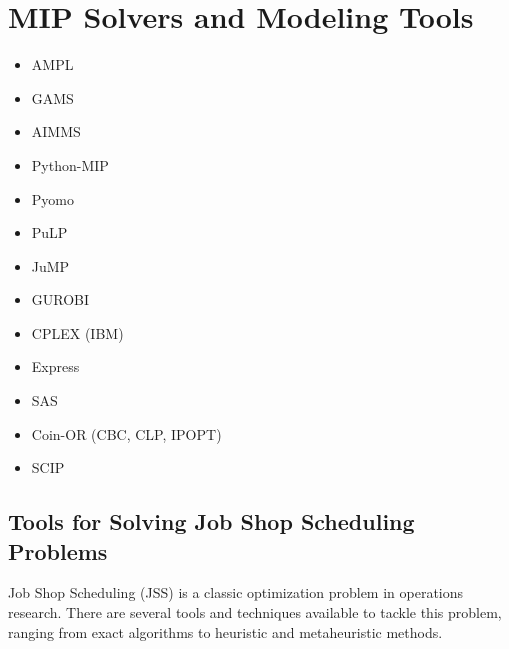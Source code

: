
%
%


\section{MIP Solvers and Modeling Tools}

\begin{itemize}
\item AMPL
\item GAMS
\item AIMMS
\item Python-MIP
\item Pyomo
\item PuLP
\item JuMP
\end{itemize}

\begin{itemize}
\item GUROBI
\item CPLEX (IBM)
\item Express
\item SAS
\item Coin-OR (CBC, CLP, IPOPT)
\item SCIP
\end{itemize}




\subsection{Tools for Solving Job Shop Scheduling Problems}

Job Shop Scheduling (JSS) is a classic optimization problem in operations research. There are several tools and techniques available to tackle this problem, ranging from exact algorithms to heuristic and metaheuristic methods.

